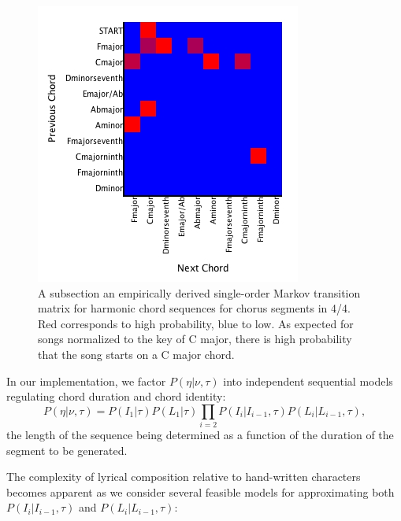\documentclass[letterpaper]{article}
\begin{document}
\begin{figure}[ht]
	\centering
	\includegraphics[width=\linewidth]{harmony}
	\caption{\label{fig:harmony} A subsection an empirically derived single-order Markov transition matrix for harmonic chord sequences for chorus segments in 4/4. Red corresponds to high probability, blue to low. As expected for songs normalized to the key of C major, there is high probability that the song starts on a C major chord. }
\end{figure}

In our implementation, we factor $P(\eta|\nu,\tau)$ into independent sequential models regulating chord duration and chord identity:
\[ P(\eta|\nu,\tau) = P(I_1|\tau) P(L_1|\tau) \prod_{i=2} P(I_i|I_{i-1},\tau) P(L_i | L_{i-1},\tau), \]
\noindent the length of the sequence being determined as a function of the duration of the segment to be generated.

The complexity of lyrical composition relative to hand-written characters becomes apparent as we consider several feasible models for approximating both $P(I_i|I_{i-1},\tau)$ and $P(L_i | L_{i-1},\tau)$:
\end{document}
